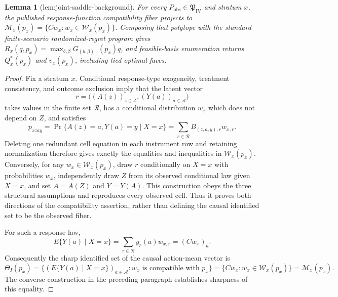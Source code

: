 \documentclass{article}
\newtheorem{lemma}{Lemma}
\begin{document}
\begin{lemma}[lem:joint-saddle-background]\label{lem:joint-saddle-background}
For every \(P_{\mathrm{obs}}\in\mathfrak P_{\mathrm{IV}}\) and stratum \(x\), the published response-function compatibility fiber projects to \(\mathcal M_x(p_x)=\{Cw_x:w_x\in\mathcal W_x(p_x)\}\). Composing that polytope with the standard finite-scenario randomized-regret program gives \(R_x(q,p_x)=\max_{b,\beta}G_{(b,\beta),\cdot}(p_x)q\), and feasible-basis enumeration returns \(Q_x^*(p_x)\) and \(v_x(p_x)\), including tied optimal faces.
\end{lemma}
\begin{proof}
Fix a stratum \(x\).  Conditional response-type exogeneity, treatment consistency, and outcome exclusion imply that the latent vector
\[
 r=\bigl((A(z))_{z\in\mathcal Z},(Y(a))_{a\in\mathcal A}\bigr)
\]
takes values in the finite set \(\mathcal R\), has a conditional distribution \(w_x\) which does not depend on \(Z\), and satisfies
\[
 p_{xzay}
 =\Pr\{A(z)=a,Y(a)=y\mid X=x\}
 =\sum_{r\in\mathcal R}B_{(z,a,y),r}w_{x,r}.
\]
Deleting one redundant cell equation in each instrument row and retaining normalization therefore gives exactly the equalities and inequalities in \(\mathcal W_x(p_x)\).  Conversely, for any \(w_x\in\mathcal W_x(p_x)\), draw \(r\) conditionally on \(X=x\) with probabilities \(w_x\), independently draw \(Z\) from its observed conditional law given \(X=x\), and set \(A=A(Z)\) and \(Y=Y(A)\).  This construction obeys the three structural assumptions and reproduces every observed cell.  Thus it proves both directions of the compatibility assertion, rather than defining the causal identified set to be the observed fiber.

For such a response law,
\[
 E\{Y(a)\mid X=x\}=\sum_{r\in\mathcal R}y_r(a)w_{x,r}=(Cw_x)_a.
\]
Consequently the sharp identified set of the causal action-mean vector is
\[
 \Theta_I(p_x)=\{(E\{Y(a)\mid X=x\})_{a\in\mathcal A}:w_x\text{ is compatible with }p_x\}
 =\{Cw_x:w_x\in\mathcal W_x(p_x)\}=\mathcal M_x(p_x).
\]
The converse construction in the preceding paragraph establishes sharpness of this equality.


\end{proof}
\end{document}
